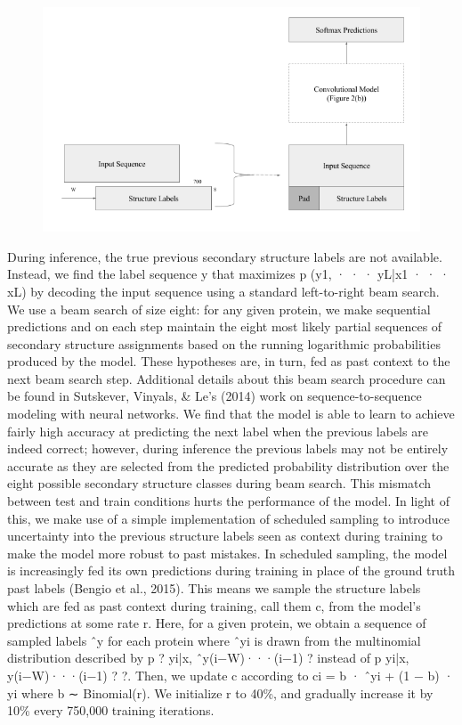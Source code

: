 \documentclass[]{scrartcl}
\begin{document}
\begin{figure}
	\centering
	\includegraphics[width=0.8\linewidth]{conditioning}
\end{figure}
During inference, the true previous secondary structure labels are not available. Instead, we find the label sequence y that maximizes p (y1, · · · yL|x1 · · · xL) by decoding the input sequence using a standard left-to-right beam search. We use a beam search of size eight: for any given protein, we make sequential predictions and on each step maintain the eight most likely partial sequences of secondary structure assignments based on the running logarithmic probabilities produced by the model. These hypotheses are, in turn, fed as past context to the next beam search step. Additional details about this beam search procedure can be found in Sutskever, Vinyals, \& Le’s (2014) work on sequence-to-sequence modeling with neural networks.
We find that the model is able to learn to achieve fairly high accuracy at predicting the next label when the previous labels are indeed correct; however, during inference the previous labels may not be entirely accurate as they are selected from the predicted probability distribution over the eight possible secondary structure classes during beam search. This mismatch between test and train conditions hurts the performance of the model. In light of this, we make use of a simple implementation of scheduled sampling to introduce uncertainty into the previous structure labels seen as context during training to make the model more robust to past mistakes. In scheduled sampling, the model is increasingly fed its own predictions during training in place of the ground truth past labels (Bengio et al., 2015). This means we sample the structure labels which are fed as past context during training, call them c, from the model’s predictions at some rate r. Here, for a given protein, we obtain a sequence of sampled labels ˆy for each protein where ˆyi is drawn from the multinomial distribution described by p ? yi|x, ˆy(i−W)···(i−1) ? instead of p yi|x, y(i−W)···(i−1) ? ?. Then, we update c according to
ci = b · ˆyi + (1 − b) · yi where b ∼ Binomial(r). We initialize r to 40\%, and gradually increase it by 10\% every 750,000 training iterations.
\end{document}
